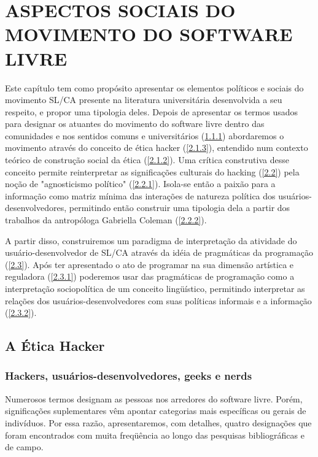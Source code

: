 \chapter{ASPECTOS SOCIAIS DO MOVIMENTO DO SOFTWARE LIVRE} \label{2}

Este capítulo tem como propósito apresentar os elementos políticos e sociais do movimento SL/CA presente na literatura universitária desenvolvida a seu respeito, e propor uma tipologia deles. Depois de apresentar os termos usados para designar os atuantes do movimento do software livre dentro das comunidades e nos sentidos comuns e universitários (\ref{2.1.1}) abordaremos o movimento através do conceito de ética hacker (\ref{2.1.3}), entendido num contexto teórico de construção social da ética (\ref{2.1.2}). Uma crítica construtiva desse conceito permite reinterpretar as significações culturais do hacking (\ref{2.2}) pela noção de "agnosticismo político" (\ref{2.2.1}). Isola-se então a paixão para a informação como matriz mínima das interações de natureza política dos usuários-desenvolvedores, permitindo então construir uma tipologia dela a partir dos trabalhos da antropóloga Gabriella Coleman (\ref{2.2.2}).

A partir disso, construiremos um paradigma de interpretação da atividade do usuário-desenvolvedor de SL/CA através da idéia de pragmáticas da programação (\ref{2.3}).  Após ter apresentado o ato de programar na sua dimensão artística e reguladora (\ref{2.3.1}) poderemos usar das pragmáticas de programação como a interpretação sociopolítica de um conceito lingüístico, permitindo interpretar as relações dos usuários-desenvolvedores com suas políticas informais e a informação (\ref{2.3.2}).

\section{A Ética Hacker} \label{2.1}

\subsection{Hackers, usuários-desenvolvedores, geeks e nerds} \label{2.1.1}

Numerosos termos designam as pessoas nos arredores do software livre.  Porém, significações suplementares vêm apontar categorias mais específicas ou gerais de indivíduos. Por essa razão, apresentaremos, com detalhes, quatro designações que foram encontrados com muita freqüência ao longo das pesquisas bibliográficas e de campo.

